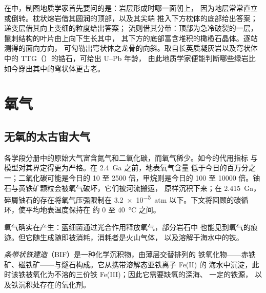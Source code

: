 \begin{inthefield}[读解绿岩带]
在中，制图地质学家首先要问的是：岩层形成时哪一面朝上，
因为地层常常直立或倒转。枕状熔岩借其圆润的顶部，以及其尖端
推入下方枕体的底部给出答案；递变层借其向上变细的粒度给出答案；
流则借其分带：顶部为急冷破裂的一层，鬣刺结构的叶片由上向下生长其中，
其下方的底部富含堆积的橄榄石晶体。逐站测得的面向方向，
可勾勒出穹状体之龙骨的向斜。取自长英质凝灰岩以及穹状体中的
TTG（）的锆石，可给出 U–Pb 年龄，
由此地质学家便能判断哪些绿岩比如今穿出其中的穹状体更古老。
\end{inthefield}

\section{氧气}\label{sec:b2:precambrian-earth:oxygen}

\subsection*{无氧的太古宙大气}

各学段分册中的原始大气富含氮气和二氧化碳，而氧气稀少。如今的代用指标
与模型对其界定得更为严格。在 \qty{2.4}{Ga} 之前，地表氧气含量
低于今日的百万分之一；二氧化碳可能是今日的 10 至 2500 倍，甲烷则是今日的
100 至 \num{10000} 倍。铀石与黄铁矿颗粒会被氧气破坏，它们被河流搬运，
原样沉积下来；在 \qty{2.415}{Ga}，碎屑铀石的存在将氧气压强限制在
\qty{3.2e-5}{atm} 以下。下文将回顾的碳循环，使平均地表温度保持在
约 0 至 \qty{40}{\celsius} 之间。

氧气确实在产生：蓝细菌通过光合作用释放氧气，部分岩石中
也能见到氧气的痕迹。但它随生成随即被消耗，消耗者是火山气体，
以及溶解于海水中的铁。

\begin{definition}[条带状铁建造]\label{def:b2:precambrian-earth:bif}
\emph{条带状铁建造}（BIF）是一种化学沉积物，由薄层交替排列的
铁氧化物——赤铁矿、磁铁矿——与燧石构成。它从携带溶解态亚铁离子 Fe(II) 的
海水中沉淀，此时该铁被氧化为不溶的三价铁 Fe(III)；因此它需要缺氧的深海、
一定的铁源，
以及铁沉积处存在的氧化剂。
\end{definition}

